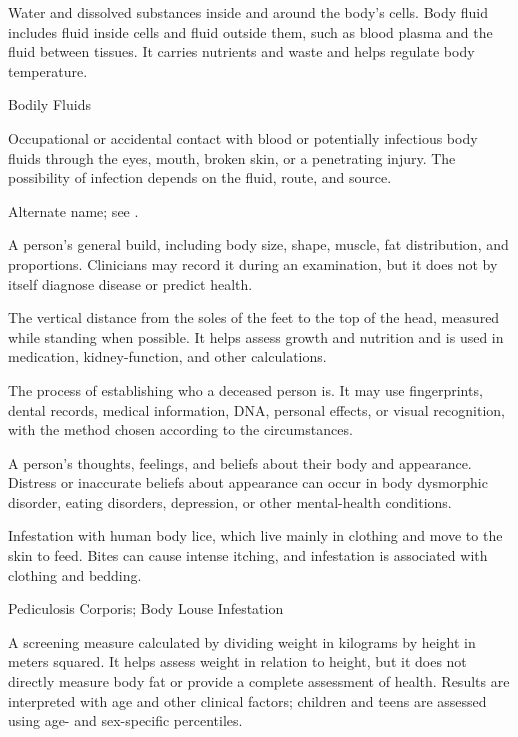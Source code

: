  Water and dissolved substances inside and around the
body's cells. Body fluid includes fluid inside cells and fluid outside them,
such as blood plasma and the fluid between tissues. It carries nutrients and
waste and helps regulate body temperature.

\synonyms
Bodily Fluids

 Occupational or accidental contact with blood or potentially infectious body fluids through the eyes, mouth, broken skin, or a penetrating injury. The possibility of infection depends on the fluid, route, and source.

 Alternate name; see .

 A person's general build, including body size, shape, muscle, fat distribution, and proportions. Clinicians may record it during an examination, but it does not by itself diagnose disease or predict health.

 The vertical distance from the soles of the feet to the top of the head, measured while standing when possible. It helps assess growth and nutrition and is used in medication, kidney-function, and other calculations.

 The process of establishing who a deceased person is. It may use fingerprints, dental records, medical information, DNA, personal effects, or visual recognition, with the method chosen according to the circumstances.

 A person's thoughts, feelings, and beliefs about their body and appearance. Distress or inaccurate beliefs about appearance can occur in body dysmorphic disorder, eating disorders, depression, or other mental-health conditions.

 Infestation with human body lice, which live mainly in
clothing and move to the skin to feed. Bites can cause intense itching, and
infestation is associated with clothing and bedding.

\synonyms
Pediculosis Corporis; Body Louse Infestation

 A screening measure calculated by dividing weight in kilograms by height in meters squared. It helps assess weight in relation to height, but it does not directly measure body fat or provide a complete assessment of health. Results are interpreted with age and other clinical factors; children and teens are assessed using age- and sex-specific percentiles.

